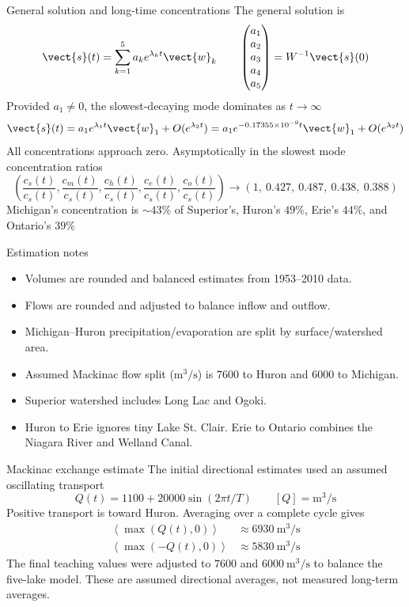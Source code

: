 \documentclass[11pt,aspectratio=169]{beamer}
\begin{document}
\begin{frame}{General solution and long-time concentrations}
\small
The general solution is
\[
\vect{s}(t)=\sum_{k=1}^{5}a_k e^{\lambda_k t}\vect{w}_k
\qquad
\begin{pmatrix}a_1\\a_2\\a_3\\a_4\\a_5\end{pmatrix}
=W^{-1}\vect{s}(0)
\]
Provided $a_1\ne0$, the slowest-decaying mode dominates as $t\to\infty$
\[
\vect{s}(t)=a_1e^{\lambda_1t}\vect{w}_1+O(e^{\lambda_2t})
=a_1e^{-0.17355\times10^{-9}t}\vect{w}_1+O(e^{\lambda_2t})
\]
All concentrations approach zero. 
Asymptotically in the slowest mode concentration ratios
\[
\left(\frac{c_s(t)}{c_s(t)},\frac{c_m(t)}{c_s(t)},
\frac{c_h(t)}{c_s(t)},\frac{c_e(t)}{c_s(t)},\frac{c_o(t)}{c_s(t)}\right)
\longrightarrow (1,\ 0.427,\ 0.487,\ 0.438,\ 0.388)
\]
Michigan's concentration is $\sim 43\%$ of Superior's, Huron's $49\%$, Erie's $44\%$, and Ontario's $39\%$ 
\end{frame}

\begin{frame}{Estimation notes}
\begin{itemize}
\item Volumes are rounded and balanced estimates from 
1953--2010 data. 
\item Flows are rounded and adjusted to balance inflow and outflow. 
\item Michigan--Huron precipitation/evaporation are split by surface/watershed area.
\item Assumed Mackinac flow split ($\mathrm{m^3/s}$) is $7600$ to Huron and $6000$ to Michigan.
\item Superior watershed includes Long Lac and Ogoki. 
\item Huron to Erie ignores tiny Lake St. Clair. 
Erie to Ontario combines the Niagara River and Welland Canal.
\end{itemize}
\end{frame}

\begin{frame}{Mackinac exchange estimate}
The initial directional estimates used an assumed oscillating transport
\[
Q(t)=1100+20000\sin(2\pi t/T)\qquad [Q]=\mathrm{m^3/s}
\]
Positive transport is toward Huron. Averaging over a complete cycle gives
\[
\begin{aligned}
\left\langle\max(Q(t),0)\right\rangle &\approx 6930\ \mathrm{m^3/s}\\
\left\langle\max(-Q(t),0)\right\rangle &\approx 5830\ \mathrm{m^3/s}
\end{aligned}
\]
The final teaching values were adjusted to $7600$ and $6000\ \mathrm{m^3/s}$ to balance the five-lake model. These are assumed directional averages, not measured long-term averages.
\end{frame}
\end{document}
